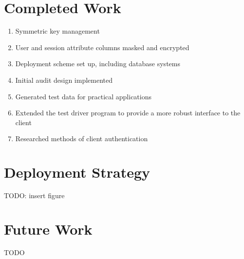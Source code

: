 \documentclass{sig-alternate}
\begin{document}
\section{Completed Work}
\begin{enumerate}
	\item Symmetric key management
	\item User and session attribute columns masked and encrypted
	\item Deployment scheme set up, including database systems
	\item Initial audit design implemented
	\item Generated test data for practical applications
	\item Extended the test driver program to provide a more robust interface to the client
	\item Researched methods of client authentication
\end{enumerate}

\section{Deployment Strategy}
TODO: insert figure

\section{Future Work}
TODO

\balance
\end{document}
